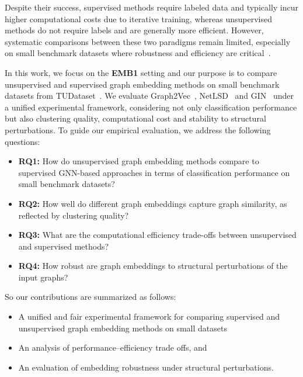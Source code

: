 Despite their success, supervised methods require labeled data 
and typically incur higher computational costs due to iterative training, 
whereas unsupervised methods do not require labels and are generally more efficient.
However, systematic comparisons between these two paradigms remain limited, especially 
on small benchmark datasets where robustness and efficiency are critical~\cite{errica2019fairgnn,dwivedi2020benchmarking}.

In this work, we focus on the \textbf{EMB1} setting and our purpose is to compare unsupervised and supervised 
graph embedding methods on small benchmark datasets from TUDataset~\cite{morris2020tudataset}.
We evaluate Graph2Vec~\cite{narayanangraph2vec}, NetLSD~\cite{tsitsulin2018netlsd} and GIN~\cite{xu2019gin} under a unified experimental 
framework, considering not only classification performance 
but also clustering quality, computational cost and stability to structural perturbations.
To guide our empirical evaluation, we address the following questions:
\begin{itemize}
    \item \textbf{RQ1:} How do unsupervised graph embedding methods compare to supervised GNN-based approaches in terms of classification performance on small benchmark datasets?
    \item \textbf{RQ2:} How well do different graph embeddings capture graph similarity, as reflected by clustering quality?
    \item \textbf{RQ3:} What are the computational efficiency trade-offs between unsupervised and supervised methods?
    \item \textbf{RQ4:} How robust are graph embeddings to structural perturbations of the input graphs?
\end{itemize}

So our contributions are summarized as follows:
\begin{itemize}
    \item A unified and fair experimental framework for comparing supervised and unsupervised graph embedding methods on small datasets
    \item An analysis of performance–efficiency trade offs, and
    \item An evaluation of embedding robustness under structural perturbations. 
\end{itemize}


